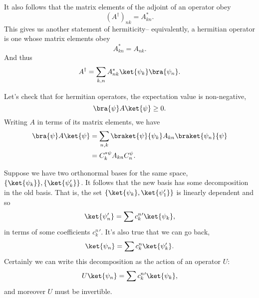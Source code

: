 It also follows that the matrix elements of the adjoint of an operator obey
\begin{equation}
    (A^\dagger)_{nk} = A_{kn}^*.
\end{equation}
This gives us another statement of hermiticity-- equivalently, a hermitian operator is one whose matrix elements obey
\begin{equation}
    A_{kn}^* = A_{nk}.
\end{equation}
And thus
\begin{equation}
    A^\dagger = \sum_{k,n} A_{nk}^*\ket{\psi_k} \bra{\psi_n}.
\end{equation}

Let's check that for hermitian operators, the expectation value is non-negative,
\begin{equation}
    \bra{\psi}A \ket{\psi} \geq 0.
\end{equation}
Writing $A$ in terms of its matrix elements, we have
\begin{align*}
    \bra{\psi}A \ket{\psi} &= \sum_{n,k} \braket{\psi}{\psi_k} A_{kn} \braket{\psi_n}{\psi}\\
        &= C_k^{* \psi} A_{kn} C^\psi_n.
\end{align*}

Suppose we have two orthonormal bases for the same space, $\set{\ket{\psi_k}},\set{\ket{\psi_k'}}$. It follows that the new basis has some decomposition in the old basis. That is, the set $\set{\ket{\psi_k},\ket{\psi_1'}}$ is linearly dependent and so
\begin{equation}
    \ket{\psi_n'} = \sum c_k^n{}' \ket{\psi_k},
\end{equation}
in terms of some coefficients $c_k^n{}'$. It's also true that we can go back,
\begin{equation}
    \ket{\psi_n} = \sum c_k^n \ket{\psi_k'}.
\end{equation}
Certainly we can write this decomposition as the action of an operator $U$:
\begin{equation}
    U\ket{\psi_n} = \sum c_k^n{}' \ket{\psi_k},
\end{equation}
and moreover $U$ must be invertible.